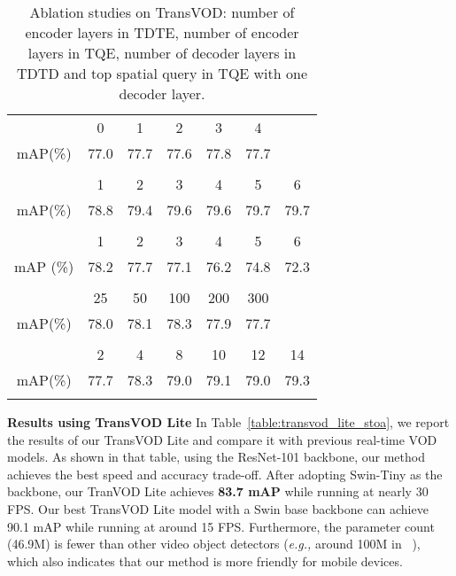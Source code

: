 \documentclass[10pt,journal,compsoc]{IEEEtran}
\begin{document}
\begin{table}[ht]
    \footnotesize
    \begin{center}
    \addtolength{\tabcolsep}{1.5pt}
    \caption{Ablation studies on TransVOD: number of encoder layers  in TDTE, number of encoder layers  in TQE, number of decoder layers   in TDTD and top  spatial query in TQE with one decoder layer.}
    \label{tab:transVOD_ablation_2}
    \begin{tabular}{c|cccccc}
\Xhline{1.0pt}
\multicolumn{7}{c}{(a) {Number of encoder layers  in TDTE.}}\\
\hline
 &  0 & 1 & 2 & 3 & 4\\
mAP(\%) & 77.0 & 77.7 & 77.6 & 77.8 & 77.7 \\
\Xhline{1.0pt}
\multicolumn{7}{c}{(b) {number of encoder layers  in TQE}}\\
\hline
 & 1 & 2 & 3  & 4 & 5 & 6\\
mAP(\%)  & 78.8  & 79.4  & 79.6 & 79.6  & 79.7 &  79.7 \\
\Xhline{1.0pt}
\multicolumn{7}{c}{(c) {number of decoder layers   in TDTD.}}\\
\hline
 & 1 & 2  & 3 & 4 & 5 & 6\\
mAP (\%)  & 78.2 & 77.7 & 77.1 & 76.2 & 74.8 & 72.3 \\
\Xhline{1.0pt}
\multicolumn{7}{c}{(d) {top  spatial query in TQE with one decoder layer.}}\\
\hline
 & 25 & 50 & 100  & 200 & 300\\
mAP(\%) & 78.0 & 78.1 & 78.3 & 77.9 &  77.7 \\
\Xhline{1.0pt}
\multicolumn{7}{c}{(d) {Number of reference frames .}}\\
\hline
  & 2 & 4 & 8  & 10 & 12 & 14\\
mAP(\%) & 77.7 & 78.3  & 79.0  & 79.1 & 79.0& 79.3 \\
\Xhline{1.0pt}
    \end{tabular}
    \end{center}
\end{table}


\noindent
\textbf{Results using TransVOD Lite}
In Table~\ref{table:transvod_lite_stoa}, we report the results of our TransVOD Lite and compare it with previous real-time VOD models. As shown in that table, using the ResNet-101 backbone, our method achieves the best speed and accuracy trade-off. After adopting Swin-Tiny as the backbone, our TranVOD Lite achieves \textbf{83.7  mAP} while running at nearly 30 FPS. Our best TransVOD Lite model with a Swin base backbone can achieve 90.1  mAP while running at around 15 FPS. Furthermore, the parameter count (46.9M) is fewer than other video object detectors (\emph{e.g.,} around 100M in ~\cite{zhu17dff}), which also indicates that our method is more friendly for mobile devices. 
\end{document}
